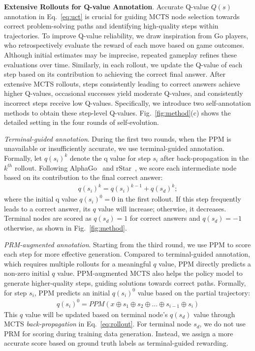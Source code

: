 \noindent\textbf{Extensive Rollouts for Q-value Annotation}. Accurate Q-value $Q(s)$ annotation in Eq.~\ref{eq:uct} is crucial for guiding MCTS node selection towards correct problem-solving paths and identifying high-quality steps within trajectories. 
To improve Q-value reliability, we draw inspiration from Go players, who  retrospectively evaluate the reward of each move based on game outcomes. Although initial estimates may be imprecise, repeated gameplay refines these evaluations over time. Similarly, in each rollout, we update the Q-value of each step based on its contribution to achieving the correct final answer. After extensive MCTS rollouts, steps consistently leading to correct answers achieve higher Q-values, occasional successes yield moderate Q-values, and consistently incorrect steps receive low Q-values. Specifically,  we introduce two self-annotation methods to obtain these step-level Q-values.  Fig.~\ref{fig:method}(c) shows the detailed setting in the four rounds of self-evolution.  

\noindent\textit{Terminal-guided annotation}. During the first two rounds, when the PPM is unavailable or insufficiently accurate, we use  terminal-guided annotation.   Formally,    let $q(s_i)^k$ denote the q value for step $s_i$ after back-propagation in the $k^{th}$ rollout. Following AlphaGo~\citep{alphago} and rStar~\citep{rstar}, we  score each intermediate node based on its contribution to the final correct answer: 
\begin{gather}
	\label{eq:rollout}
	q(s_i)^k = q(s_i)^{k-1}+q(s_d)^{k}; 
\end{gather}
where the initial q value   $q(s_i)^0=0$  in the first rollout. If this step frequently leads to a correct answer,  its $q$ value will increase; otherwise, it decreases. Terminal nodes  are scored as $q(s_d)=1$  for correct answers and $q(s_d)=-1$  otherwise, as shown in Fig.~\ref{fig:method}.


\noindent\textit{PRM-augmented annotation}. Starting from the third round, we use PPM to score each step for more effective generation. Compared to terminal-guided annotation, which requires multiple rollouts for a  meaningful $q$ value,  PPM directly predicts a non-zero initial $q$ value.
PPM-augmented MCTS also helps the policy model to generate higher-quality steps, guiding solutions towards correct paths. Formally, for step $s_i$, PPM predicts an initial $q(s_i)^0$ value  based on the partial trajectory:
\begin{gather}
	\label{eq:qvalue}
	q (s_i)^0=PPM(x\oplus s_1\oplus s_2\oplus ...\oplus s_{i-1}\oplus s_i)    
\end{gather}
This $q$ value will be updated based on terminal node's $q(s_d)$ value through MCTS \textit{back-propagation} in Eq.~\ref{eq:rollout}.
 For terminal node $s_d$, we do not use  PRM for scoring during training data generation. Instead, we assign a more accurate score based on ground truth labels as terminal-guided rewarding.  


